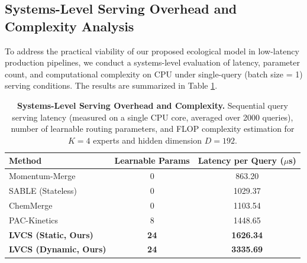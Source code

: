 \subsection{Systems-Level Serving Overhead and Complexity Analysis}
To address the practical viability of our proposed ecological model in low-latency production pipelines, we conduct a systems-level evaluation of latency, parameter count, and computational complexity on CPU under single-query (batch size = 1) serving conditions. The results are summarized in Table \ref{tab:systems_overhead}.

\begin{table}[htbp]
\caption{\textbf{Systems-Level Serving Overhead and Complexity.} Sequential query serving latency (measured on a single CPU core, averaged over 2000 queries), number of learnable routing parameters, and FLOP complexity estimation for $K=4$ experts and hidden dimension $D=192$.}
\label{tab:systems_overhead}
\vskip 0.15in
\begin{center}
\begin{small}
\begin{sc}
\begin{tabular}{lcc}
\toprule
Method & Learnable Params & Latency per Query ($\mu$s) \\
\midrule
Momentum-Merge & 0 & 863.20 \\
SABLE (Stateless) & 0 & 1029.37 \\
ChemMerge & 0 & 1103.54 \\
PAC-Kinetics & 8 & 1448.65 \\
\textbf{LVCS (Static, Ours)} & \textbf{24} & \textbf{1626.34} \\
\textbf{LVCS (Dynamic, Ours)} & \textbf{24} & \textbf{3335.69} \\
\bottomrule
\end{tabular}
\end{sc}
\end{small}
\end{center}
\vskip -0.1in
\end{table}

